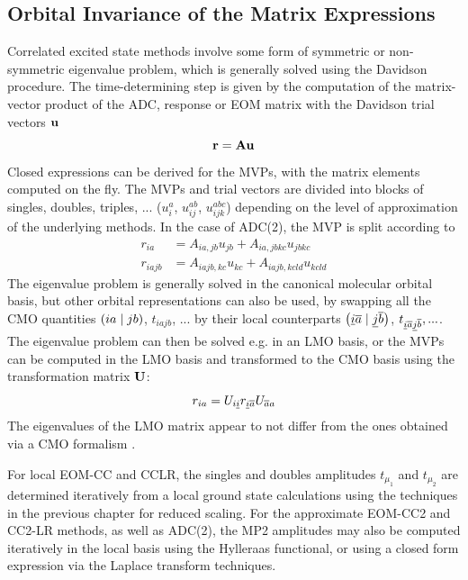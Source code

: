 \subsection{Orbital Invariance of the Matrix Expressions}

Correlated excited state methods involve some form of symmetric or non-symmetric eigenvalue problem, which is generally solved using the Davidson procedure. The time-determining step is given by the computation of the matrix-vector product of the ADC, response or EOM matrix with the Davidson trial vectors $\mathbf{u}$
\begin{equation}
\mathbf{r} = \mathbf{A} \mathbf{u}
\end{equation}
\noindent Closed expressions can be derived for the MVPs, with the matrix elements computed on the fly. The MVPs and trial vectors are divided into blocks of singles, doubles, triples, ... ($u_i^a$, $u_{ij}^{ab}$, $u_{ijk}^{abc}$) depending on the level of approximation of the underlying methods. In the case of ADC(2), the MVP is split according to
\begin{align}
r_{ia} &= A_{ia,jb} u_{jb} + A_{ia,jbkc} u_{jbkc} \\
r_{iajb} &= A_{iajb,kc} u_{kc} + A_{iajb,kcld} u_{kcld} 
\end{align}
\noindent The eigenvalue problem is generally solved in the canonical molecular orbital basis, but other orbital representations can also be used, by swapping all the CMO quantities $\left( ia \mid jb \right)$, $t_{iajb}$, ... by their local counterparts $\left( \underline{i}\overline{a} \mid \underline{j}\overline{b} \right)$, $t_{\underline{i}\overline{a}\underline{j}\overline{b}}, ...$. The eigenvalue problem can then be solved e.g. in an LMO basis, or the MVPs can be computed in the LMO basis and transformed to the CMO basis using the transformation matrix $\mathbf{U}$:
\begin{equation}
r_{ia} = U_{i\underline{i}} r_{\underline{i}\overline{a}} U_{\overline{a} a} 
\end{equation}
\noindent The eigenvalues of the LMO matrix appear to not differ from the ones obtained via a CMO formalism \cite{Kats2009}.

For local EOM-CC and CCLR, the singles and doubles amplitudes $t_{\mu_1}$ and $t_{\mu_2}$ are determined iteratively from a local ground state calculations using the techniques in the previous chapter for reduced scaling. For the approximate EOM-CC2 and CC2-LR methods, as well as ADC(2), the MP2 amplitudes may also be computed iteratively in the local basis using the Hylleraas functional, or using a closed form expression via the Laplace transform techniques.   


